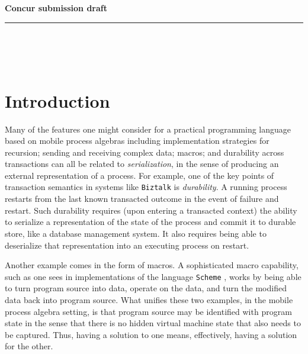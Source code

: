 \documentclass[]{amsart}
\theoremstyle{definition}
\theoremstyle{remark}
\numberwithin{equation}{subsection}
\newcommand{\paperversion}{Draft Version 0.1 - December 30, 2003}
\newenvironment{toc}
{
\begin{list}{}{
   \setlength{\leftmargin}{0.4in}
   \setlength{\rightmargin}{0.6in}
   \setlength{\parskip}{0pt}
 } \item }
{\end{list}}
\begin{document}
\noindent
{\large \textbf{
Concur submission draft}}\\
\rule{6.25in}{0.75pt}\\\\\\

\maketitle




\section{Introduction}

Many of the features one might consider for a practical programming
language based on mobile process algebras
\cite{MilnerPi}\cite{SangiorgiWalker} including implementation
strategies for recursion; sending and receiving complex data; macros;
and durability across transactions can all be related to
\textit{serialization}, in the sense of producing an external
representation of a process. For example, one of the key points of
transaction semantics in systems like \texttt{Biztalk} \cite{biztalk}
is \textit{durability}. A running process restarts from the last known
transacted outcome in the event of failure and restart. Such
durability requires (upon entering a transacted context) the ability
to serialize a representation of the state of the process and commit
it to durable store, like a database management system. It also
requires being able to deserialize that representation into an
executing process on restart.
 
Another example comes in the form of macros. A sophisticated macro
capability, such as one sees in implementations of the language
\texttt{Scheme} \cite{r5rs}, works by being able to turn program
source into data, operate on the data, and turn the modified data back
into program source. What unifies these two examples, in the mobile
process algebra setting, is that program source may be identified with
program state in the sense that there is no hidden virtual machine
state that also needs to be captured. Thus, having a solution to one
means, effectively, having a solution for the other.
\end{document}
